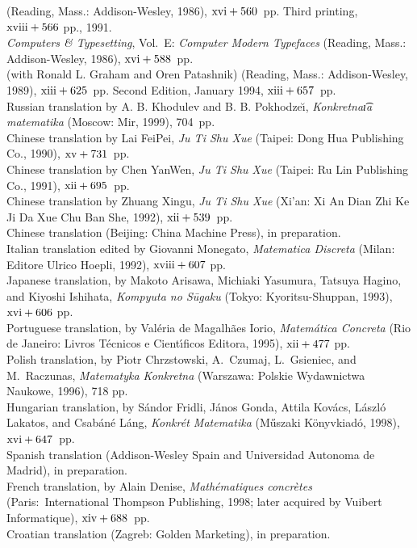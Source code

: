  (Reading, Mass.: Addison-Wesley, 1986), $\rm xvi+560$~pp.
 Third printing, $\rm xviii+566$ pp., 1991.
\yyskip
\\{\sl Computers \& Typesetting}, Vol.~E: {\sl Computer Modern Typefaces\/}
 (Reading, Mass.: Addison-Wesley, 1986), $\rm xvi+588$~pp.
\yyskip
\\(with Ronald L. Graham and Oren Patashnik)
 (Reading, Mass.: Addison-Wesley, 1989), $\rm xiii+625$~pp.
 Second Edition, January 1994, $\rm xiii+657$~pp.
\\Russian translation by A. B. Khodulev and B. B. Pokhodze\u\i,
 {\sl Konkretna\t\i a  matematika\/} (Moscow: Mir, 1999), 704~pp.
\\Chinese translation by Lai FeiPei, {\sl Ju Ti Shu Xue\/}
 (Taipei: Dong Hua Publishing Co., 1990), $\rm xv+731$~pp.
\\Chinese translation by Chen YanWen, {\sl Ju Ti Shu Xue\/} (Taipei: Ru Lin
 Publishing Co., 1991), $\rm xii+695$~pp.
\\Chinese translation by Zhuang Xingu, {\sl Ju Ti Shu Xue\/} (Xi'an:
  Xi An Dian Zhi Ke Ji Da Xue Chu Ban She, 1992), $\rm xii+539$~pp.
\\Chinese translation (Beijing: China Machine Press), in preparation.
\\Italian translation edited by Giovanni Monegato, {\sl Matematica Discreta\/}
 (Milan: Editore Ulrico Hoepli, 1992), $\rm xviii+607$ pp.
\\Japanese translation, by Makoto Arisawa, Michiaki Yasumura, Tatsuya Hagino,
 and Kiyoshi Ishihata, {\sl Kompyuta no S\=ugaku\/}
 (Tokyo: Kyoritsu-Shuppan, 1993), $\rm xvi+606$ pp.
\\Portuguese translation, by Val\'eria de Magalh\~aes Iorio,
 {\sl Matem\'atica Concreta\/}  (Rio de Janeiro: Livros T\'ecnicos e
 Cient{\'\i}ficos Editora, 1995), $\rm xii+477$ pp.
\\Polish translation, by Piotr Chrzstowski, A.~Czumaj, L.~Gsieniec, and
 M.~Raczunas, {\sl Matematyka Kon\-kretna\/}
 (Warszawa: Polskie Wydawnictwa Nauk\-owe, 1996), 718 pp.
\\Hungarian translation, by S\'andor Fridli, J\'anos Gonda, Attila Kov\'acs,
 L\'aszl\'o Lakatos, and Csab\'an\'e L\'ang, {\sl Konkr\'et Matematika\/}
 (M\H{u}szaki K\"onyvkiad\'o, 1998), $\rm xvi+647$~pp.
\\Spanish translation (Addison-Wesley Spain and Universidad Autonoma de
 Madrid), in preparation.
\\French translation, by Alain Denise, {\sl Math\'ematiques concr\`etes\/}
(Paris:\ International Thompson Publishing, 1998; later acquired by
  Vuibert Informatique), $\rm xiv+688$~pp.
\\Croatian translation (Zagreb: Golden Marketing), in preparation.

